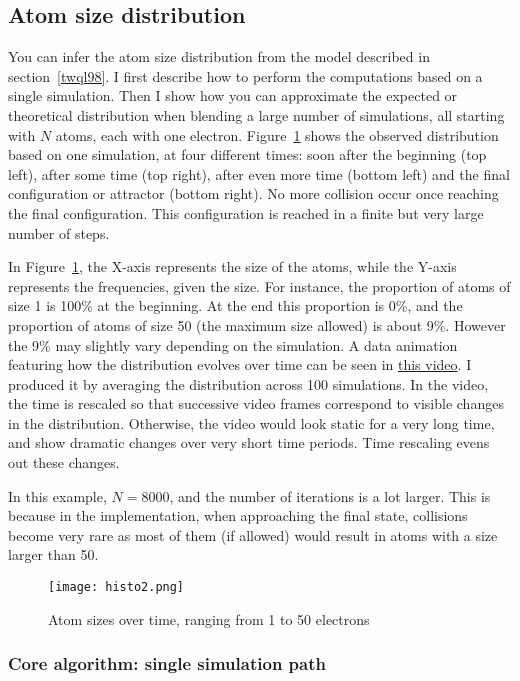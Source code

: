 \documentclass[oneside,10pt]{book}
\begin{document}
\subsection{Atom size distribution} 

You can infer the atom size distribution from the model described in section~\ref{twql98}. I first describe how to perform the computations based on a single simulation. Then I show how you can approximate the expected or theoretical distribution when blending a large number of simulations, all starting with $N$ atoms, each with one electron. Figure~\ref{twql9809} shows the observed distribution based on one simulation, at four different times: soon after the beginning (top left), after some time (top right), after even more time (bottom left) and the final configuration or attractor (bottom right). No more collision occur once reaching the final configuration. This configuration is reached in a finite but very large number of steps.

In Figure~\ref{twql9809}, the X-axis represents the size of the atoms, while the Y-axis represents the frequencies, given the size. For instance, the proportion of atoms of size 1 is 100\% at the beginning. At the end this proportion is 0\%, and the proportion of atoms of size 50 (the maximum size allowed) is about 9\%. However the 9\% may slightly vary depending on the simulation. A data animation featuring how the distribution evolves over time can be seen in  
\href{https://youtu.be/MUvoO9YmfgY}{this video}. I produced it by averaging the distribution across 100 simulations. 
In the video, the time is rescaled so that successive video frames correspond to visible changes in the distribution. Otherwise, the video would look static for a very long time, and show dramatic changes over very short time periods. Time rescaling evens out these changes. 

In this example, $N=8000$, and the number of iterations is a lot larger. This is because in the implementation, when approaching the final state, collisions become very rare as most of them (if allowed) would result in atoms with a size larger than 50. 

\begin{figure}[H]
\centering
\texttt{[image: histo2.png]}  
\caption{Atom sizes over time, ranging from 1 to 50 electrons}
\label{twql9809}
\end{figure}


\subsubsection{Core algorithm: single simulation path}
\end{document}
